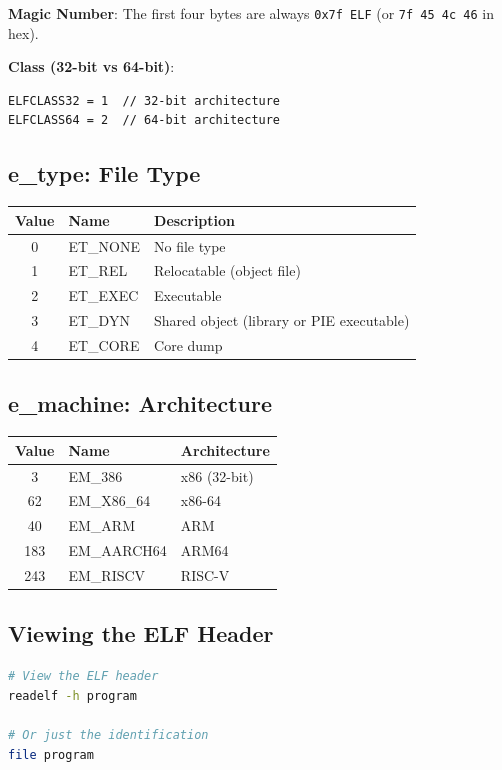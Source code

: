 \textbf{Magic Number}: The first four bytes are always \texttt{0x7f ELF} (or \texttt{7f 45 4c 46} in hex).

\textbf{Class (32-bit vs 64-bit)}:
\begin{verbatim}
ELFCLASS32 = 1  // 32-bit architecture
ELFCLASS64 = 2  // 64-bit architecture
\end{verbatim}

\subsection{e\_type: File Type}

\begin{tabular}{|c|l|l|}
\hline
\textbf{Value} & \textbf{Name} & \textbf{Description} \\
\hline
0 & ET\_NONE & No file type \\
\hline
1 & ET\_REL & Relocatable (object file) \\
\hline
2 & ET\_EXEC & Executable \\
\hline
3 & ET\_DYN & Shared object (library or PIE executable) \\
\hline
4 & ET\_CORE & Core dump \\
\hline
\end{tabular}

\subsection{e\_machine: Architecture}

\begin{tabular}{|c|l|l|}
\hline
\textbf{Value} & \textbf{Name} & \textbf{Architecture} \\
\hline
3 & EM\_386 & x86 (32-bit) \\
\hline
62 & EM\_X86\_64 & x86-64 \\
\hline
40 & EM\_ARM & ARM \\
\hline
183 & EM\_AARCH64 & ARM64 \\
\hline
243 & EM\_RISCV & RISC-V \\
\hline
\end{tabular}

\subsection{Viewing the ELF Header}

\begin{lstlisting}[language=bash]
# View the ELF header
readelf -h program

# Or just the identification
file program
\end{lstlisting}

